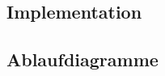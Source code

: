 \lipsum[1-2]
%
\subsection{Implementation}
\lipsum[1-3]
%
\subsection{Ablaufdiagramme}
%
\lipsum[1-5]